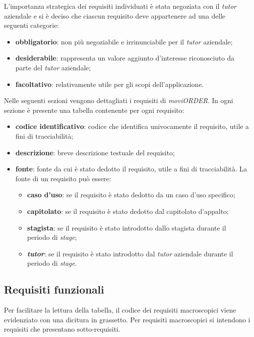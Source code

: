 L'importanza strategica dei requisiti individuati è stata negoziata con il \textit{tutor} aziendale e si è deciso che ciascun requisito deve appartenere ad una delle seguenti categorie:
\begin{itemize}
	\item \textbf{obbligatorio}: non più negoziabile e irrinunciabile per il \textit{tutor} aziendale;
	\item \textbf{desiderabile}: rappresenta un valore aggiunto d'interesse riconosciuto da parte del \textit{tutor} aziendale;
	\item \textbf{facoltativo}: relativamente utile per gli scopi dell'applicazione.
\end{itemize}

Nelle seguenti sezioni vengono dettagliati i requisiti di \textit{moviORDER}. In ogni sezione è presente una tabella contenente per ogni requisito:
\begin{itemize}
	\item \textbf{codice identificativo}: codice che identifica univocamente il requisito, utile a fini di tracciabilità;
	\item \textbf{descrizione}: breve descrizione testuale del requisito;
	\item \textbf{fonte}: fonte da cui è stato dedotto il requisito, utile a fini di tracciabilità. La fonte di un requisito può essere:
		\begin{itemize}
			\item \textbf{caso d'uso}: se il requisito è stato dedotto da un caso d'uso specifico;
			\item \textbf{capitolato}: se il requisito è stato dedotto dal capitolato d'appalto;
			\item \textbf{stagista}: se il requisito è stato introdotto dallo stagista durante il periodo di \textit{stage};
			\item \textbf{\textit{tutor}}: se il requisito è stato introdotto dal \textit{tutor} aziendale durante il periodo di \textit{stage}.
		\end{itemize}
\end{itemize}

\newpage

\subsection{Requisiti funzionali}

Per facilitare la lettura della tabella, il codice dei requisiti macroscopici viene evidenziato con una dicitura in grassetto. Per requisiti macroscopici si intendono i requisiti che presentano sotto-requisiti.

